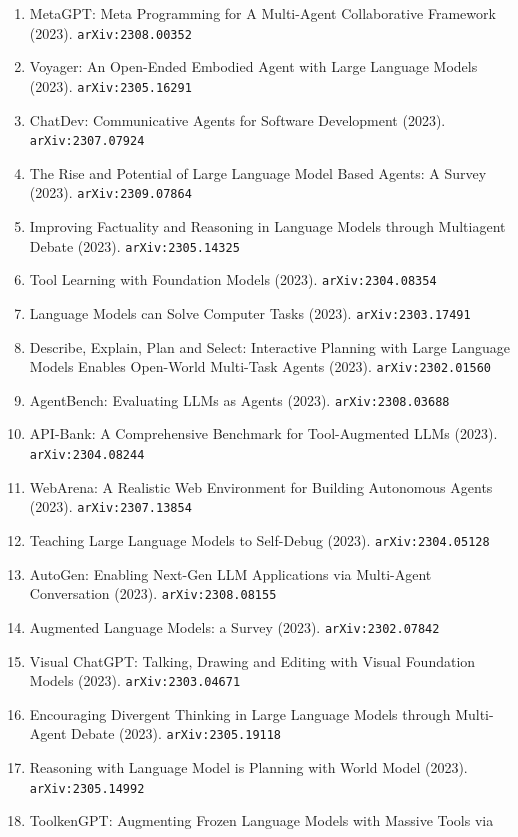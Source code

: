 \documentclass[11pt]{article}
\begin{document}
\begin{enumerate}
  Model Society (2023). \texttt{arXiv:2303.17760}
  \item MetaGPT: Meta Programming for A Multi-Agent Collaborative Framework (2023). \texttt{arXiv:2308.00352}
  \item Voyager: An Open-Ended Embodied Agent with Large Language Models (2023). \texttt{arXiv:2305.16291}
  \item ChatDev: Communicative Agents for Software Development (2023). \texttt{arXiv:2307.07924}
  \item The Rise and Potential of Large Language Model Based Agents: A Survey (2023). \texttt{arXiv:2309.07864}
  \item Improving Factuality and Reasoning in Language Models through Multiagent
  Debate (2023). \texttt{arXiv:2305.14325}
  \item Tool Learning with Foundation Models (2023). \texttt{arXiv:2304.08354}
  \item Language Models can Solve Computer Tasks (2023). \texttt{arXiv:2303.17491}
  \item Describe, Explain, Plan and Select: Interactive Planning with Large
  Language Models Enables Open-World Multi-Task Agents (2023). \texttt{arXiv:2302.01560}
  \item AgentBench: Evaluating LLMs as Agents (2023). \texttt{arXiv:2308.03688}
  \item API-Bank: A Comprehensive Benchmark for Tool-Augmented LLMs (2023). \texttt{arXiv:2304.08244}
  \item WebArena: A Realistic Web Environment for Building Autonomous Agents (2023). \texttt{arXiv:2307.13854}
  \item Teaching Large Language Models to Self-Debug (2023). \texttt{arXiv:2304.05128}
  \item AutoGen: Enabling Next-Gen LLM Applications via Multi-Agent Conversation (2023). \texttt{arXiv:2308.08155}
  \item Augmented Language Models: a Survey (2023). \texttt{arXiv:2302.07842}
  \item Visual ChatGPT: Talking, Drawing and Editing with Visual Foundation
  Models (2023). \texttt{arXiv:2303.04671}
  \item Encouraging Divergent Thinking in Large Language Models through
  Multi-Agent Debate (2023). \texttt{arXiv:2305.19118}
  \item Reasoning with Language Model is Planning with World Model (2023). \texttt{arXiv:2305.14992}
  \item ToolkenGPT: Augmenting Frozen Language Models with Massive Tools via

\end{enumerate}
\end{document}
